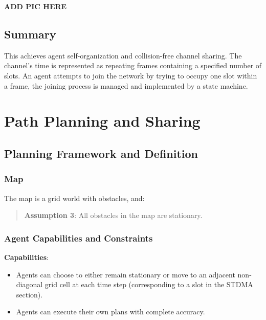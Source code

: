 \textbf{ADD PIC HERE} %

\subsection{Summary}

This achieves agent self-organization and collision-free channel sharing. The channel's time is represented as repeating frames containing a specified number of slots. An agent attempts to join the network by trying to occupy one slot within a frame, the joining process is managed and implemented by a state machine.

\section{Path Planning and Sharing}


\subsection{Planning Framework and Definition}


\subsubsection{Map}
The map is a grid world with obstacles, and:
\begin{quotation}
    \textbf{Assumption 3}:
    All obstacles in the map are stationary.
\end{quotation}

\subsubsection{Agent Capabilities and Constraints}

\textbf{Capabilities}:
\begin{itemize}
    \item Agents can choose to either remain stationary or move to an adjacent non-diagonal grid cell at each time step (corresponding to a slot in the STDMA section).
    \item Agents can execute their own plans with complete accuracy.
\end{itemize}

